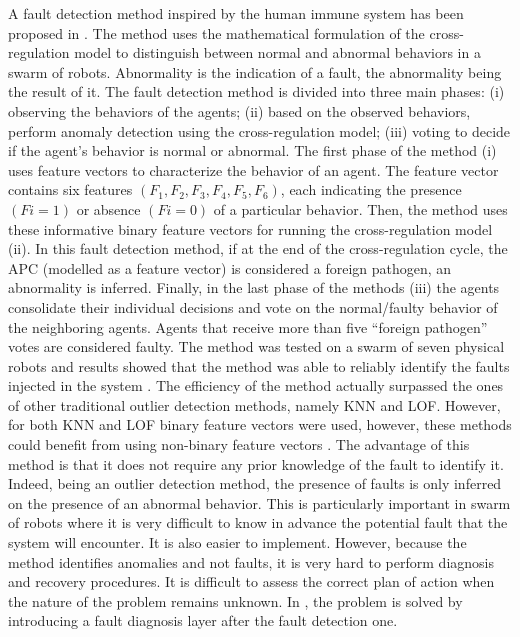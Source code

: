 A fault detection method inspired by the human immune system has been proposed in \cite{ tarapore2015err, tarapore2017generic}. The method uses the mathematical formulation of the cross-regulation model to distinguish between normal and abnormal behaviors in a swarm of robots. Abnormality is the indication of a fault, the abnormality being the result of it. The fault detection method is divided into three main phases: (i) observing the behaviors of the agents; (ii) based on the observed behaviors, perform anomaly detection using the cross-regulation model; (iii) voting to decide if the agent’s behavior is normal or abnormal. The first phase of the method (i) uses feature vectors to characterize the behavior of an agent. The feature vector contains six features $(F_1, F_2, F_3, F_4, F_5, F_6)$, each indicating the presence $(Fi=1)$ or absence $(Fi=0)$ of a particular behavior. Then, the method uses these informative binary feature vectors for running the cross-regulation model (ii). In this fault detection method, if at the end of the cross-regulation cycle, the \ac{APC} (modelled as a feature vector) is considered a foreign pathogen, an abnormality is inferred. Finally, in the last phase of the methods (iii) the agents consolidate their individual decisions and vote on the normal/faulty behavior of the neighboring agents. Agents that receive more than five “foreign pathogen” votes are considered faulty. The method was tested on a swarm of seven physical robots and results showed that the method was able to reliably identify the faults injected in the system \cite{tarapore2019fault}. The efficiency of the method actually surpassed the ones of other traditional outlier detection methods, namely \ac{KNN} and  \ac{LOF}. However, for both \ac{KNN} and \ac{LOF} binary feature vectors were used, however, these methods could benefit from using non-binary feature vectors \cite{tarapore2019fault}. The advantage of this method is that it does not require any prior knowledge of the fault to identify it. Indeed, being an outlier detection method, the presence of faults is only inferred on the presence of an abnormal behavior. This is particularly important in swarm of robots where it is very difficult to know in advance the potential fault that the system will encounter. It is also easier to implement. However, because the method identifies anomalies and not faults, it is very hard to perform diagnosis and recovery procedures. It is difficult to assess the correct plan of action when the nature of the problem remains unknown. In \cite{okeefe2018adaptive}, the problem is solved by introducing a fault diagnosis layer after the fault detection one. 

